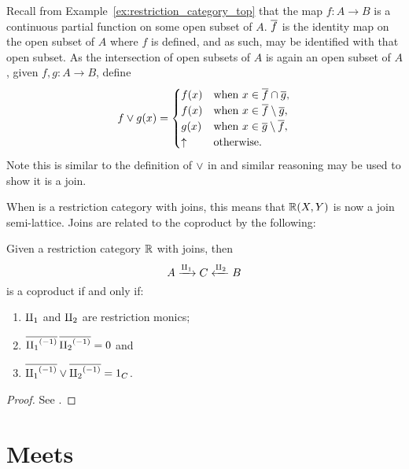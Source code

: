 \begin{example}\label{ex:joins_in_top}
   Recall from Example~\ref{ex:restriction_category_top} that the map $f:A\to B$ is a continuous
   partial function on some open subset of $A$. $\overline{f}$ is the identity map on the open subset of
   $A$ where $f$ is defined, and as such, may be identified with that open subset.
   As the intersection of open subsets of $A$ is again
   an open subset of $A$, given $f,g:A\to B$, define
   \[
      f\vee g(x) = \begin{cases}
        f(x) &\text{when }x\in  \overline{f}\cap\overline{g},\\
        f(x) &\text{when }x\in  \overline{f}\setminus\overline{g},\\
        g(x) &\text{when }x\in  \overline{g}\setminus\overline{f},\\
        \uparrow &\text{otherwise.}
      \end{cases}
   \]
   Note this is similar to the definition of $\vee$ in \Par and similar reasoning may be used to
   show it is a join.
\end{example}

When \R is a restriction category with joins, this means that $\mathbb{R}(X,Y)$ is now a join
semi-lattice. Joins are related to the coproduct by the following:

\begin{theorem}\label{lem:join_determines_coproduct}
  Given a restriction category $\mathbb{R}$ with joins, then
  \[
    A \xrightarrow{\amalg_{1}} C \xleftarrow{\amalg_{2}} B
  \]
  is a coproduct if and only if:
  \begin{enumerate}[{(}i{)}]
    \item $\amalg_{1}$ and $\amalg_{2}$ are restriction monics;
    \item $\overline{{\amalg_{1}}^{(-1)}}\,\overline{{\amalg_{2}}^{(-1)}} = 0$ and
    \item $\overline{{\amalg_{1}}^{(-1)}} \vee \overline{{\amalg_{2}}^{(-1)}} = 1_C$.
  \end{enumerate}
\end{theorem}
\begin{proof}
  See \cite{cockett-guo2007:joinrestrictioncats}.
\end{proof}



\section{Meets} %
\label{sub:meets_in_restriction_categories}

